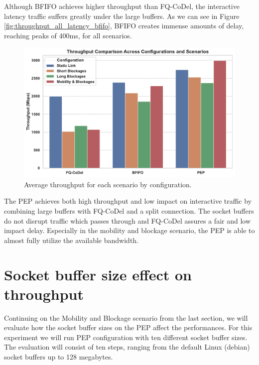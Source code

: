 \documentclass[a4paper,english, 12pt]{report}
\begin{document}
Although BFIFO achieves higher throughput than FQ-CoDel, the interactive latency traffic suffers greatly under the large buffers. As we can see in Figure \ref{fig:throughput_all_latency_bfifo}, BFIFO creates immense amounts of delay, reaching peaks of 400ms, for all scenarios.\\

\begin{figure}[!h!] %
	\centering
	\includegraphics[scale=0.55]{../diagrams/witestlab/throughput/all.pdf}
  	\caption{Average throughput for each scenario by configuration.}
  	\label{fig:throughput_all}
\end{figure}

The PEP achieves both high throughput and low impact on interactive traffic by combining large buffers with FQ-CoDel and a split connection. The socket buffers do not disrupt traffic which passes through and FQ-CoDel assures a fair and low impact delay. Especially in the mobility and blockage scenario, the PEP is able to almost fully utilize the available bandwidth.\\

\section{Socket buffer size effect on throughput}
Continuing on the Mobility and Blockage scenario from the last section, we will evaluate how the socket buffer sizes on the PEP affect the performances. For this experiment we will run PEP configuration with ten different socket buffer sizes. The evaluation will consist of ten steps, ranging from the default Linux (debian) socket buffers up to 128 megabytes.\\
\end{document}
